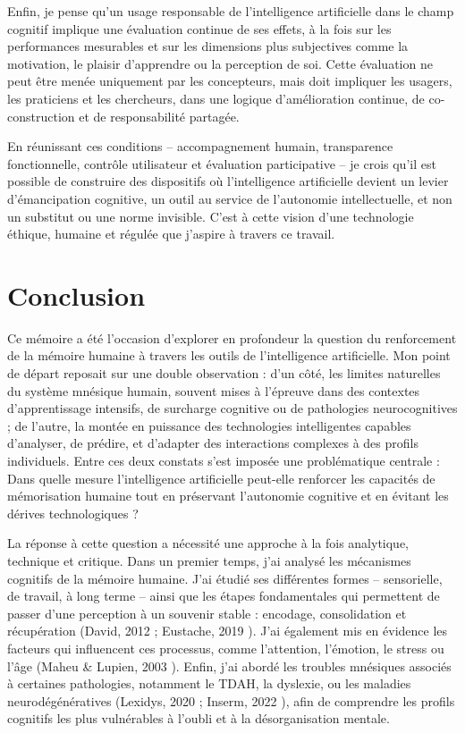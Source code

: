 \documentclass[11pt,a4paper]{report}
\begin{document}
Enfin, je pense qu’un usage responsable de l’intelligence artificielle dans le champ cognitif implique une évaluation continue de ses effets, à la fois sur les performances mesurables et sur les dimensions plus subjectives comme la motivation, le plaisir d’apprendre ou la perception de soi. Cette évaluation ne peut être menée uniquement par les concepteurs, mais doit impliquer les usagers, les praticiens et les chercheurs, dans une logique d’amélioration continue, de co-construction et de responsabilité partagée.

En réunissant ces conditions – accompagnement humain, transparence fonctionnelle, contrôle utilisateur et évaluation participative – je crois qu’il est possible de construire des dispositifs où l’intelligence artificielle devient un levier d’émancipation cognitive, un outil au service de l’autonomie intellectuelle, et non un substitut ou une norme invisible. C’est à cette vision d’une technologie éthique, humaine et régulée que j’aspire à travers ce travail.

\chapter*{Conclusion}

Ce mémoire a été l’occasion d’explorer en profondeur la question du renforcement de la mémoire humaine à travers les outils de l’intelligence artificielle. Mon point de départ reposait sur une double observation : d’un côté, les limites naturelles du système mnésique humain, souvent mises à l’épreuve dans des contextes d’apprentissage intensifs, de surcharge cognitive ou de pathologies neurocognitives ; de l’autre, la montée en puissance des technologies intelligentes capables d’analyser, de prédire, et d’adapter des interactions complexes à des profils individuels. Entre ces deux constats s’est imposée une problématique centrale : Dans quelle mesure l’intelligence artificielle peut-elle renforcer les capacités de mémorisation humaine tout en préservant l’autonomie cognitive et en évitant les dérives technologiques ?

La réponse à cette question a nécessité une approche à la fois analytique, technique et critique. Dans un premier temps, j’ai analysé les mécanismes cognitifs de la mémoire humaine. J’ai étudié ses différentes formes – sensorielle, de travail, à long terme – ainsi que les étapes fondamentales qui permettent de passer d’une perception à un souvenir stable : encodage, consolidation et récupération (David, 2012 \cite{clarys} ; Eustache, 2019 \cite{inserm}). J’ai également mis en évidence les facteurs qui influencent ces processus, comme l’attention, l’émotion, le stress ou l’âge (Maheu \& Lupien, 2003 \cite{maheulupienn}). Enfin, j’ai abordé les troubles mnésiques associés à certaines pathologies, notamment le TDAH, la dyslexie, ou les maladies neurodégénératives (Lexidys, 2020 \cite{lexidys} ; Inserm, 2022 \cite{inserm2}), afin de comprendre les profils cognitifs les plus vulnérables à l’oubli et à la désorganisation mentale.
\end{document}
